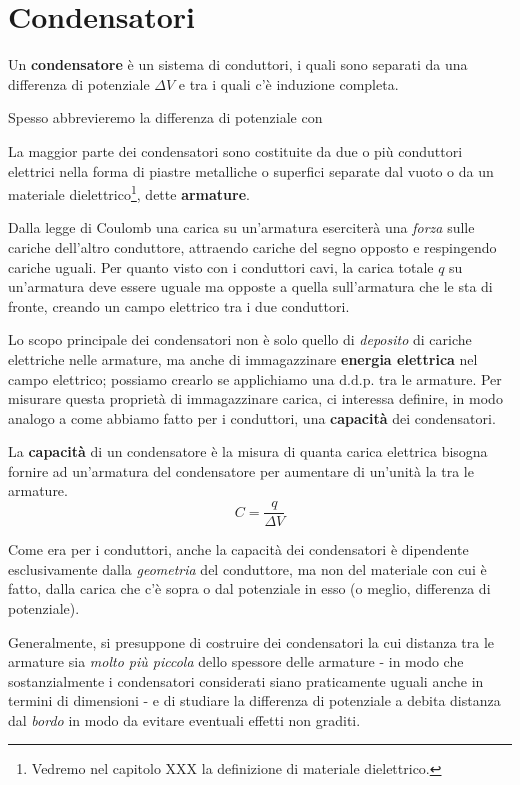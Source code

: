 \section{Condensatori}
\begin{define}[Condensatore]
	Un \textbf{condensatore} è un sistema di conduttori, i quali sono separati da una differenza di potenziale $\Delta V$ e tra i quali c'è induzione completa.
\end{define}
\begin{notate}
	Spesso abbrevieremo la differenza di potenziale con \ddp
\end{notate}
La maggior parte dei condensatori sono costituite da due o più conduttori elettrici nella forma di piastre metalliche o superfici separate dal vuoto o da un materiale dielettrico\footnote{Vedremo nel capitolo XXX la definizione di materiale dielettrico.}, dette \textbf{armature}.

Dalla legge di Coulomb una carica su un'armatura eserciterà una \textit{forza} sulle cariche dell'altro conduttore, attraendo cariche del segno opposto e respingendo cariche uguali. Per quanto visto con i conduttori cavi, la carica totale $q$ su un'armatura deve essere uguale ma opposte a quella sull'armatura che le sta di fronte, creando un campo elettrico tra i due conduttori.

Lo scopo principale dei condensatori non è solo quello di \textit{deposito} di cariche elettriche nelle armature, ma anche di immagazzinare \textbf{energia elettrica} nel campo elettrico; possiamo crearlo se applichiamo una $\textrm{d.d.p.}$ tra le armature. Per misurare questa proprietà di immagazzinare carica, ci interessa definire, in modo analogo a come abbiamo fatto per i conduttori, una \textbf{capacità} dei condensatori.
\begin{define}
	La \textbf{capacità} di un condensatore è la misura di quanta carica elettrica bisogna fornire ad un'armatura del condensatore per aumentare di un'unità la \ddp tra le armature.
	\begin{equation}
		C=\frac{q}{\Delta V}
	\end{equation}
\end{define}
Come era per i conduttori, anche la capacità dei condensatori è dipendente esclusivamente dalla \textit{geometria} del conduttore, ma non del materiale con cui è fatto, dalla carica che c'è sopra o dal potenziale in esso (o meglio, differenza di potenziale).
\begin{observe}
	Generalmente, si presuppone di costruire dei condensatori la cui distanza tra le armature sia \textit{molto più piccola} dello spessore delle armature - in modo che sostanzialmente i condensatori considerati siano praticamente uguali anche in termini di dimensioni - e di studiare la differenza di potenziale a debita distanza dal \textit{bordo} in modo da evitare eventuali effetti non graditi.
\end{observe}
